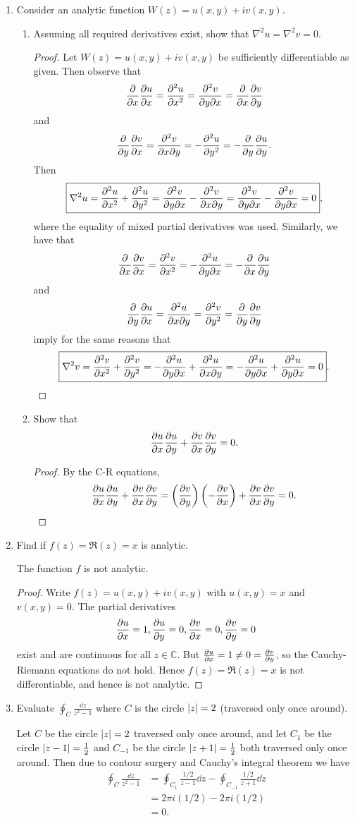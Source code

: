 \documentclass[11pt]{article}
\newcommand{\br}[1]{\left(#1\right)}
\begin{document}
\begin{enumerate}[label=20.\arabic*]
    \item Consider an analytic function $W(z) = u(x,y) + iv(x,y)$.
    \begin{enumerate}[label=(\alph*)]
        \item Assuming all required derivatives exist, show that $\nabla^2u = \nabla^2v = 0$.
        \begin{proof}
            Let $W(z) = u(x,y) + iv(x,y)$ be sufficiently differentiable as given. Then observe that \[\pdv{x}\pdv{u}{x} = \pdv[2]{u}{x} = \pdv[2]{v}{y}{x} = \pdv{x} \pdv{v}{y}\] and \[\pdv{y}\pdv{v}{x} = \pdv[2]{v}{x}{y} = -\pdv[2]{u}{y} = -\pdv{y}\pdv{u}{y}.\]
            Then \[\boxed{\nabla^2u = \pdv[2]{u}{x} + \pdv[2]{u}{y} = \pdv[2]{v}{y}{x} - \pdv[2]{v}{x}{y} = \pdv[2]{v}{y}{x} - \pdv[2]{v}{y}{x} = 0},\] where the equality of mixed partial derivatives was used.
            Similarly, we have that \[\pdv{x}\pdv{v}{x} = \pdv[2]{v}{x} = -\pdv[2]{u}{y}{x} = -\pdv{x} \pdv{u}{y}\] and \[\pdv{y}\pdv{u}{x} = \pdv[2]{u}{x}{y} = \pdv[2]{v}{y} = \pdv{y}\pdv{v}{y}\] imply for the same reasons that \[\boxed{\nabla^2v = \pdv[2]{v}{x} + \pdv[2]{v}{y} = -\pdv[2]{u}{y}{x} + \pdv[2]{u}{x}{y} = -\pdv[2]{u}{y}{x} + \pdv[2]{u}{y}{x} = 0}.\]
        \end{proof}
        \item Show that \[\pdv{u}{x}\pdv{u}{y} + \pdv{v}{x}\pdv{v}{y} = 0.\]
        \begin{proof}
            By the C-R equations, \[\pdv{u}{x}\pdv{u}{y} + \pdv{v}{x}\pdv{v}{y} = \br{\pdv{v}{y}}\br{-\pdv{v}{x}} + \pdv{v}{x}\pdv{v}{y} = 0.\]
        \end{proof}
    \end{enumerate}
    \item Find if $f(z) = \Re(z) = x$ is analytic.
    
    The function $f$ is not analytic.
    \begin{proof}
        Write $f(z) = u(x,y) + iv(x,y)$ with $u(x,y) = x$ and $v(x,y) = 0$. The partial derivatives \[\pdv{u}{x} = 1, \pdv{u}{y} = 0, \pdv{v}{x} = 0, \pdv{v}{y} = 0\] exist and are continuous for all $z\in \mathbb{C}$. But $\pdv{u}{x} = 1\neq 0 = \pdv{v}{y}$, so the Cauchy-Riemann equations do not hold. Hence $f(z) = \Re(z) = x$ is not differentiable, and hence is not analytic.
    \end{proof}
    \item Evaluate $\oint_C \frac{\dd{z}}{z^2-1}$ where $C$ is the circle $\abs{z} = 2$ (traversed only once around).
    
    Let $C$ be the circle $\abs{z} = 2$ traversed only once around, and let $C_1$ be the circle $\abs{z-1} = \frac{1}{2}$ and $C_{-1}$ be the circle $\abs{z+1} = \frac{1}{2}$ both traversed only once around. Then due to contour surgery and Cauchy's integral theorem we have
    \begin{align*}
        \oint_C \frac{\dd{z}}{z^2-1} &= \oint_{C_1} \frac{1/2}{z-1}\dd{z} - \oint_{C_{-1}} \frac{1/2}{z+1}\dd{z}\\
        &= 2\pi i (1/2) - 2\pi i (1/2)\\
        &= 0.
    \end{align*}
\end{enumerate}
\end{document}
